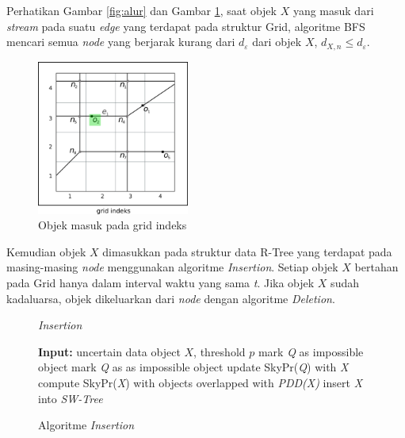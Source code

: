\documentclass[conference]{IEEEtran}
\begin{document}
Perhatikan Gambar \ref{fig:alur} dan Gambar \ref{fig:alur1-2}, saat objek $ X $ yang masuk dari \textit{stream} pada suatu \textit{edge} yang terdapat pada struktur Grid, algoritme BFS mencari semua \textit{node} yang berjarak kurang dari $ d_\varepsilon $ dari objek $ X $, $ d_{X, n} \le d_\varepsilon $.

\begin{figure}[H]
	\centering
	\includegraphics[width=5cm]{imgs/alur/alur1.png}
	\caption{Objek masuk pada grid indeks}
	\label{fig:alur1-2}
\end{figure}

Kemudian objek $ X $ dimasukkan pada struktur data R-Tree yang terdapat pada masing-masing \textit{node} menggunakan algoritme \textit{Insertion}. Setiap objek $ X $ bertahan pada Grid hanya dalam interval waktu yang sama \textit{t}. Jika objek $ X $ sudah kadaluarsa, objek dikeluarkan dari \textit{node} dengan algoritme \textit{Deletion}.

	
	\begin{figure}[H]
		\begin{algorithm}[H]
			\label{algo:insertion}
			\caption{\textit{Insertion}}
			\begin{algorithmic}[1]
				\State \textbf{Input: } uncertain data object $ X $, threshold $ p $
				\State mark \textit{Q} as impossible object
				\Else
				\State mark \textit{Q} as as impossible object
				\Else 
				\State update SkyPr(\textit{Q}) with \textit{X}
				\EndIf
				\EndIf
				\EndFor
				\State compute SkyPr(\textit{X}) with objects overlapped with \textit{PDD(X)}
				\State insert \textit{X} into \textit{SW-Tree}
			\end{algorithmic}
		\end{algorithm}
		\caption{Algoritme \textit{Insertion}}
	\end{figure}
\end{document}
